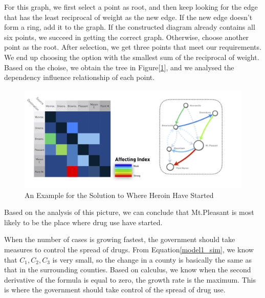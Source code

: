\documentclass{mcmthesis}
\begin{document}
For this graph, we first select a point as root, and then keep looking for the edge that has the least reciprocal of weight as the new edge. If the new edge doesn't form a ring, add it to the graph. If the constructed diagram already contains all six points, we succeed in getting the correct graph. Otherwise, choose another point as the root. After selection, we get three points that meet our requirements. We end up choosing the option with the smallest sum of the reciprocal of weight. Based on the choise, we obtain the tree in Figure[\ref{model1_tree}], and we analysed the dependency influence relationship of each point.
\begin{figure}[ht]
	\centering
	\includegraphics[width=15cm]{figure-release/Model1.GridMap.png}
	\caption{An Example for the Solution to Where Heroin Have Started}\label{model1_tree}
\end{figure}

Based on the analysis of this picture, we can conclude that Mt.Pleasant is most likely to be the place where drug use have started.

When the number of cases is growing fastest, the government should take measures to control the spread of drugs. From Equation\eqref{model1_sim}, we know that $C_1, C_2, C_3$ is very small, so the change in a county is basically the same as that in the surrounding counties. Based on calculus, we know when the second derivative of the formula is equal to zero, the growth rate is the maximum.
This is where the government should take control of the spread of drug use.
\end{document}
